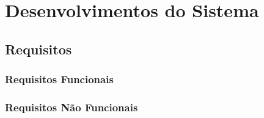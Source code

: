 \chapter{Desenvolvimentos do Sistema} \label{cha:desenvolvimneto}

\section{Requisitos}


\subsection{Requisitos Funcionais}

\subsection{Requisitos Não Funcionais}